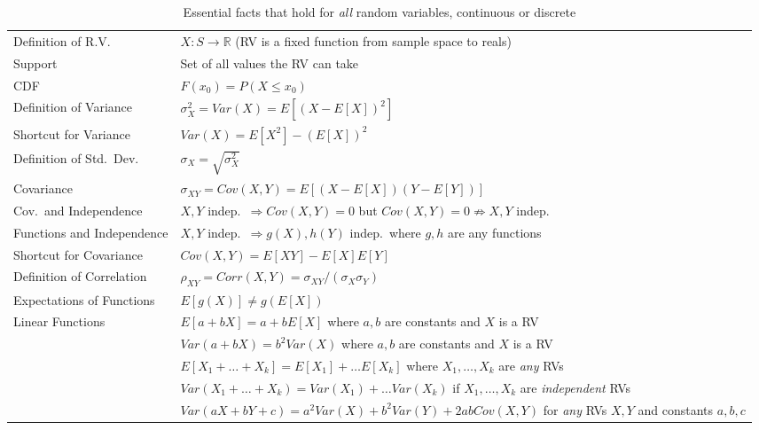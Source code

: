 \documentclass[12pt]{article}
\begin{document}
\begin{sidewaystable}
\centering
\begin{tabular}{l|l}
\hline
Definition of R.V.\ & $X\colon S \rightarrow \mathbb{R}$ (RV is a fixed function from sample space to reals) \\
Support& Set of all values the RV can take\\
CDF & $F(x_0) = P(X\leq x_0)$\\
Definition of Variance&$\sigma_X^2 = Var(X) = E\left[\left(X - E[X]\right)^2 \right]$\\
Shortcut for Variance&$Var(X) = E[X^2] - \left(E[X]\right)^2$\\
Definition of Std.\ Dev.\ &$\sigma_X = \sqrt{\sigma_X^2}$\\
Covariance&$\sigma_{XY} = Cov(X,Y) = E\left[\left(X - E[X]\right)\left(Y - E[Y]\right)\right]$\\
	Cov.\ and Independence&$X,Y$ indep.\ $\Rightarrow Cov(X,Y) = 0$ but $Cov(X,Y)=0 \nRightarrow X,Y$ indep.\\
	Functions and Independence& $X,Y$ indep.\ $\Rightarrow g(X), h(Y)$ indep.\ where $g,h$ are any functions\\
Shortcut for Covariance&$Cov(X,Y) = E[XY] - E[X]E[Y]$\\
Definition of Correlation & $\rho_{XY} = Corr(X,Y) = \sigma_{XY}/(\sigma_X \sigma_Y)$ \\
Expectations of Functions& $E[g(X)] \neq g\left( E[X]\right)$\\
Linear Functions & $E[a + bX] = a + b E[X]$ where $a,b$ are constants and $X$ is a RV\\
&  $Var(a+bX) = b^2 Var(X)$  where $a,b$ are constants and $X$ is a RV \\
& $E[X_1 + \hdots + X_k] = E[X_1] + \hdots E[X_k]$ where $X_1, \hdots, X_k$ are \emph{any} RVs\\
& $Var(X_1 + \hdots + X_k) = Var(X_1) + \hdots Var(X_k)$ if $X_1, \hdots, X_k$ are \emph{independent} RVs\\
&$Var(aX + bY + c) = a^2 Var(X) + b^2 Var(Y) + 2ab Cov(X,Y)$ for \emph{any} RVs $X,Y$ and constants $a,b,c$\\
\hline
\end{tabular}
\caption{Essential facts that hold for \emph{all} random variables, continuous or discrete}
\end{sidewaystable}
\end{document}

